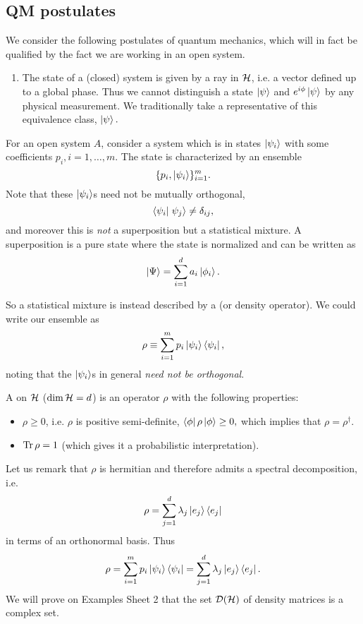\subsection*{QM postulates}
We consider the following postulates of quantum mechanics, which will in fact be qualified by the fact we are working in an open system.
\begin{enumerate}
    \item The state of a (closed) system is given by a ray in $\mathcal H$, i.e. a vector defined up to a global phase. Thus we cannot distinguish a state $\left| \psi \right>$ and $e^{i\phi}\left| \psi \right>$ by any physical measurement. We traditionally take a representative of this equivalence class, $\left| \psi \right>.$
\end{enumerate}
For an open system $A$, consider a system which is in states $\left| \psi_i \right>$ with some coefficients $p_i, i=1,\ldots, m$. The state is characterized by an ensemble
\begin{equation}
    \{p_i,\left| \psi_i \right>\}_{i=1}^m.
\end{equation}
Note that these $\left| \psi_i \right>$s need not be mutually orthogonal,
\begin{equation}
    \braket{\psi_i}{\psi_j}\neq \delta_{ij},
\end{equation}
and moreover this is \emph{not} a superposition but a statistical mixture. A superposition is a pure state where the state is normalized and can be written as 
\begin{equation}
    \left| \Psi \right>=\sum_{i=1}^d a_i \left| \phi_i \right>.
\end{equation}

So a statistical mixture is instead described by a  (or density operator). We could write our ensemble as
\begin{equation}
    \rho \equiv \sum_{i=1}^m p_i \left| \psi_i \right> \left< \psi_i \right|,
\end{equation}
noting that the $\left| \psi_i \right>$s in general \emph{need not be orthogonal}.
\begin{defn}
    A  on $\mathcal H$ ($\dim \mathcal H = d$) is an operator $\rho$ with the following properties:
    \begin{itemize}
        \item $\rho \geq 0$, i.e. $\rho$ is positive semi-definite, $\left< \phi \right|\rho \left| \phi \right>\geq 0,$ which implies that $\rho=\rho^\dagger$.
        \item $\operatorname{Tr} \rho =1$ (which gives it a probabilistic interpretation).
    \end{itemize}
\end{defn}
Let us remark that $\rho$ is hermitian and therefore admits a spectral decomposition, i.e.
\begin{equation}
    \rho = \sum_{j=1}^d \lambda_j \left| e_j \right>\left< e_j \right|
\end{equation}
in terms of an orthonormal basis. Thus
\begin{equation}
    \rho=\sum_{i=1}^m p_i \left| \psi_i \right>\left< \psi_i \right| = \sum_{j=1}^d \lambda_j \left| e_j \right> \left< e_j \right|.
\end{equation}
We will prove on Examples Sheet 2 that the set
$\mathcal{D}(\mathcal H)$ of density matrices is a complex set.

